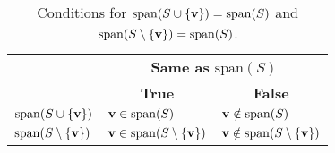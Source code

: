 \begin{table}[ht!]
    \begin{center}
    \begin{tabular}{@{}lll@{}}
    \toprule
    & \multicolumn{2}{c}{\textbf{Same as $\mathrm{span}(S)$}}                               \\ \cmidrule(l){2-3} 
    & \multicolumn{1}{c}{\textbf{True}}        & \multicolumn{1}{c}{\textbf{False}}          \\ \midrule
    \textbf{$\mathrm{span}(S\cup\{{\bf v}\})$}      & ${\bf v}\in\mathrm{span}(S)$                 & ${\bf v}\notin\mathrm{span}(S)$                 \\
    \textbf{$\mathrm{span}(S\setminus\{{\bf v}\})$} & ${\bf v}\in\mathrm{span}(S\setminus\{{\bf v}\})$ & ${\bf v}\notin\mathrm{span}(S\setminus\{{\bf v}\})$ \\ \bottomrule
    \end{tabular}
    \caption{Conditions for $\mathrm{span}(S\cup\{{\bf v}\}) = \mathrm{span}(S)$ and $\mathrm{span}(S\setminus\{{\bf v}\}) = \mathrm{span}(S)$.}
    \end{center}
\end{table}

